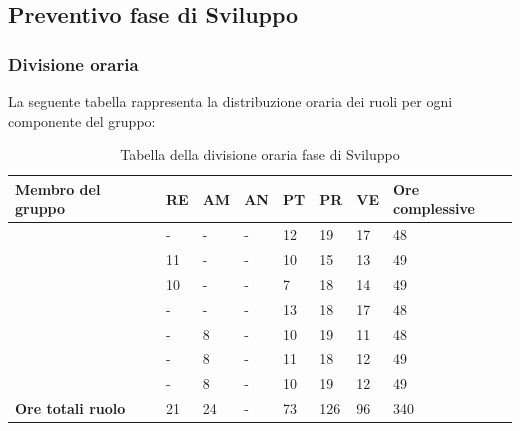 \subsection{Preventivo fase di Sviluppo}

\subsubsection{Divisione oraria}
La seguente tabella rappresenta la distribuzione oraria dei ruoli per ogni componente del gruppo:
{
	\renewcommand{\arraystretch}{2}
	\begin{longtable}[h!] { C{3.5cm} C{1cm} C{1cm} C{1cm} C{1cm} C{1cm} C{1cm} C{2cm}}
	\caption{Tabella della divisione oraria fase di Sviluppo}\\
	\rowcolor{\primaryColor}
	
	\textcolor{\secondaryColor}{\textbf{Membro del gruppo}} & 
	\textcolor{\secondaryColor}{\textbf{RE}} & 
	\textcolor{\secondaryColor}{\textbf{AM}} & 
	\textcolor{\secondaryColor}{\textbf{AN}} & 
	\textcolor{\secondaryColor}{\textbf{PT}} & 
	\textcolor{\secondaryColor}{\textbf{PR}} & 
	\textcolor{\secondaryColor}{\textbf{VE}} & 
	\textcolor{\secondaryColor}{\textbf{Ore complessive}}\\	
	\endhead
	
	\AW{}                     & - & - & - & 12 & 19 & 17 & 48 \\
	\AT{}                     & 11 & - & - & 10 & 15 & 13 & 49 \\
	\AD{}                     & 10 & - & - & 7 & 18 & 14 & 49 \\
	\EC{}                     & - & - & - & 13 & 18 & 17 & 48 \\
	\EM{}                     & - & 8 & - & 10 & 19 & 11 & 48 \\
	\FP{}                     & - & 8 & - & 11 & 18 & 12 & 49 \\
	\GG{}                     & - & 8 & - & 10 & 19 & 12 & 49 \\
	\textbf{Ore totali ruolo} & 21 & 24 & - & 73 & 126 & 96 & 340\\
	
	\end{longtable}
}

